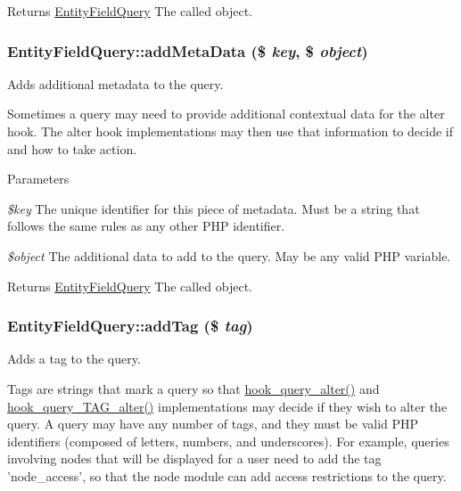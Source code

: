 \begin{DoxyReturn}{Returns}
\hyperlink{classEntityFieldQuery}{EntityFieldQuery} The called object. 
\end{DoxyReturn}
\hypertarget{classEntityFieldQuery_a143d69ef04486e7b78e0f7536b89ee53}{
\subsubsection[{addMetaData}]{\setlength{\rightskip}{0pt plus 5cm}EntityFieldQuery::addMetaData (\$ {\em key}, \/  \$ {\em object})}}
\label{classEntityFieldQuery_a143d69ef04486e7b78e0f7536b89ee53}
Adds additional metadata to the query.

Sometimes a query may need to provide additional contextual data for the alter hook. The alter hook implementations may then use that information to decide if and how to take action.


\begin{DoxyParams}{Parameters}
\item[{\em \$key}]The unique identifier for this piece of metadata. Must be a string that follows the same rules as any other PHP identifier. \item[{\em \$object}]The additional data to add to the query. May be any valid PHP variable.\end{DoxyParams}
\begin{DoxyReturn}{Returns}
\hyperlink{classEntityFieldQuery}{EntityFieldQuery} The called object. 
\end{DoxyReturn}
\hypertarget{classEntityFieldQuery_a7cfe2a721e0aee895516cd46a59c872e}{
\subsubsection[{addTag}]{\setlength{\rightskip}{0pt plus 5cm}EntityFieldQuery::addTag (\$ {\em tag})}}
\label{classEntityFieldQuery_a7cfe2a721e0aee895516cd46a59c872e}
Adds a tag to the query.

Tags are strings that mark a query so that \hyperlink{group__hooks_gaf166f6375e9f7b5919d719eb91198d47}{hook\_\-query\_\-alter()} and \hyperlink{group__hooks_ga12527037deeb76adcab1000e984fdfce}{hook\_\-query\_\-TAG\_\-alter()} implementations may decide if they wish to alter the query. A query may have any number of tags, and they must be valid PHP identifiers (composed of letters, numbers, and underscores). For example, queries involving nodes that will be displayed for a user need to add the tag 'node\_\-access', so that the node module can add access restrictions to the query.

